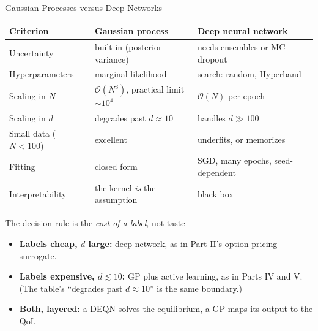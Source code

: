 \documentclass[aspectratio=169,11pt]{beamer}
\newcommand{\yes}{\textcolor{darkgreen}{\ding{51}}}
\newcommand{\no}{\textcolor{harvardcrimson}{\ding{55}}}
\newcommand{\mixed}{\textcolor{softorange}{\ding{108}}}
\newcommand{\emphc}[1]{\textcolor{harvardcrimson}{#1}}
\begin{document}
\begin{frame}{Gaussian Processes versus Deep Networks}
\begin{center}
\scriptsize
\setlength{\tabcolsep}{4pt}
\begin{tabular}{l l l}
\toprule
\textbf{Criterion} & \textbf{Gaussian process} & \textbf{Deep neural network} \\
\midrule
Uncertainty & \yes built in (posterior variance) & \no needs ensembles or MC dropout \\
Hyperparameters & \yes marginal likelihood & \mixed search: random, Hyperband \\
Scaling in $N$ & \no $\mathcal{O}(N^3)$, practical limit ${\sim}10^4$ & \yes $\mathcal{O}(N)$ per epoch \\
Scaling in $d$ & \no degrades past $d \approx 10$ & \yes handles $d \gg 100$ \\
Small data ($N < 100$) & \yes excellent & \no underfits, or memorizes \\
Fitting & \yes closed form & \mixed SGD, many epochs, seed-dependent \\
Interpretability & \yes the kernel \emph{is} the assumption & \no black box \\
\bottomrule
\end{tabular}
\end{center}

\vspace{0.15cm}
\begin{alertblock}{The decision rule is the \emph{cost of a label}, not taste}
\small
\begin{itemize}\itemsep1pt
  \item \textbf{Labels cheap, $d$ large:} \emphc{deep network}, as in Part II's option-pricing surrogate.
  \item \textbf{Labels expensive, $d \lesssim 10$:} \emphc{GP plus active learning}, as in Parts IV and V. (The table's ``degrades past $d \approx 10$'' is the same boundary.)
  \item \textbf{Both, layered:} a DEQN solves the equilibrium, a GP maps its output to the QoI.
\end{itemize}
\end{alertblock}
\end{frame}
\end{document}
